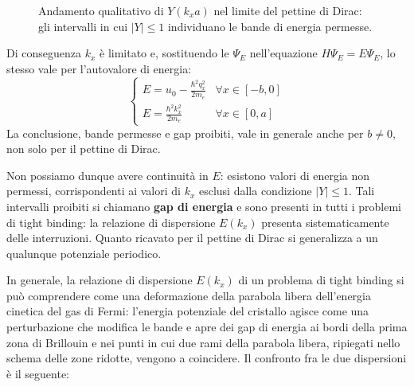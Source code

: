 \begin{example}
\begin{figure}[htbp]
    \caption{Andamento qualitativo di \( Y(k_x a) \) nel limite del pettine di Dirac: gli intervalli in cui \( |Y| \le 1 \) individuano le bande di energia permesse.}
    \label{fig:Y_kronig_penney}
\end{figure}

Di conseguenza \( k_x \) è limitato e, sostituendo le \( \Psi_E \) nell'equazione \( H \Psi_E = E \Psi_E \), lo stesso vale per l'autovalore di energia:
\begin{equation}
    \begin{cases}
        \displaystyle E = u_0 - \frac{\hbar^2 q_x^2}{2 m_e} & \forall x \in [-b, 0] \\[8pt]
        \displaystyle E = \frac{\hbar^2 k_x^2}{2 m_e} & \forall x \in [0, a]
    \end{cases}
\end{equation}
La conclusione, bande permesse e gap proibiti, vale in generale anche per \( b \neq 0 \), non solo per il pettine di Dirac.
  \end{example}

Non possiamo dunque avere continuità in \( E \): esistono valori di energia non permessi, corrispondenti ai valori di \( k_x \) esclusi dalla condizione \( |Y| \le 1 \). Tali intervalli proibiti si chiamano \textbf{gap di energia} e sono presenti in tutti i problemi di tight binding: la relazione di dispersione \( E(k_x) \) presenta sistematicamente delle interruzioni. Quanto ricavato per il pettine di Dirac si generalizza a un qualunque potenziale periodico.

In generale, la relazione di dispersione \( E(k_x) \) di un problema di tight binding si può comprendere come una deformazione della parabola libera dell'energia cinetica del gas di Fermi: l'energia potenziale del cristallo agisce come una perturbazione che modifica le bande e apre dei gap di energia ai bordi della prima zona di Brillouin e nei punti in cui due rami della parabola libera, ripiegati nello schema delle zone ridotte, vengono a coincidere. Il confronto fra le due dispersioni è il seguente:

